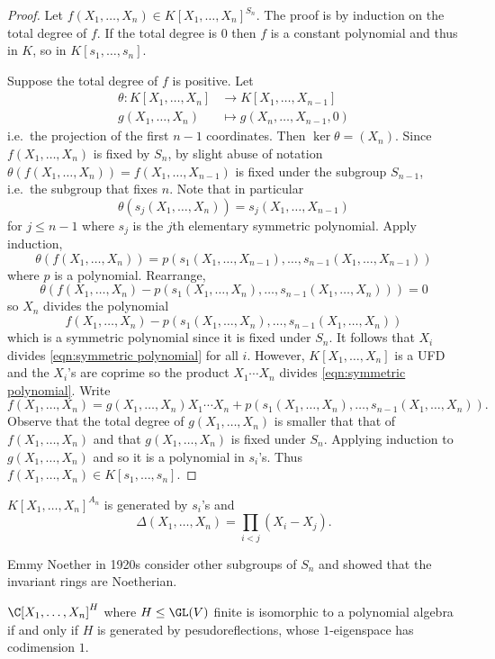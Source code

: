 \documentclass[a4paper]{article}
\begin{document}
\begin{proof}
  Let \(f(X_1, \dots, X_n) \in K[X_1, \dots, X_n]^{S_n}\). The proof is by induction on the total degree of \(f\). If the total degree is \(0\) then \(f\) is a constant polynomial and thus in \(K\), so in \(K[s_1, \dots, s_n]\).

  Suppose the total degree of \(f\) is positive. Let
  \begin{align*}
    \theta: K[X_1, \dots, X_n] &\to K[X_1, \dots, X_{n - 1}] \\
    g(X_1, \dots, X_n) &\mapsto g(X_n, \dots, X_{n - 1}, 0)
  \end{align*}
  i.e.\ the projection of the first \(n - 1\) coordinates. Then \(\ker \theta = (X_n)\). Since \(f(X_1, \dots, X_n)\) is fixed by \(S_n\), by slight abuse of notation \(\theta(f(X_1, \dots, X_n)) = f(X_1, \dots, X_{n - 1})\) is fixed under the subgroup \(S_{n - 1}\), i.e.\ the subgroup that fixes \(n\). Note that in particular
  \[
    \theta(s_j(X_1, \dots, X_n)) = s_j(X_1, \dots, X_{n - 1})
  \]
  for \(j \leq n - 1\) where \(s_j\) is the \(j\)th elementary symmetric polynomial. Apply induction,
  \[
    \theta(f(X_1, \dots, X_n)) = p(s_1(X_1, \dots, X_{n - 1}), \dots, s_{n - 1}(X_1, \dots, X_{n - 1}))
  \]
  where \(p\) is a polynomial. Rearrange,
  \[
    \theta(f(X_1, \dots, X_n) - p(s_1(X_1, \dots, X_n), \dots, s_{n - 1}(X_1, \dots, X_n))) = 0
  \]
  so \(X_n\) divides the polynomial
  \begin{equation*}
    \label{eqn:symmetric polynomial}
    f(X_1, \dots, X_n) - p(s_1(X_1, \dots, X_n), \dots, s_{n - 1}(X_1, \dots, X_n))
    \tag{\(\ast\)}
  \end{equation*}
  which is a symmetric polynomial since it is fixed under \(S_n\). It follows that \(X_i\) divides \eqref{eqn:symmetric polynomial} for all \(i\). However, \(K[X_1, \dots, X_n]\) is a UFD and the \(X_i\)'s are coprime so the product \(X_1\cdots X_n\) divides \eqref{eqn:symmetric polynomial}. Write
  \[
    f(X_1, \dots, X_n) = g(X_1, \dots, X_n) X_1\cdots X_n + p(s_1(X_1, \dots, X_n), \dots, s_{n - 1}(X_1, \dots, X_n)).
  \]
  Observe that the total degree of \(g(X_1, \dots, X_n)\) is smaller that that of \(f(X_1, \dots, X_n)\) and that \(g(X_1, \dots, X_n)\) is fixed under \(S_n\). Applying induction to \(g(X_1, \dots, X_n)\) and so it is a polynomial in \(s_i\)'s. Thus \(f(X_1, \dots, X_n) \in K[s_1, \dots, s_n]\).
\end{proof}

\begin{eg}
  \(K[X_1, \dots, X_n]^{A_n}\) is generated by \(s_i\)'s and
  \[
    \Delta(X_1, \dots, X_n) = \prod_{i < j}(X_i - X_j).
  \]
\end{eg}

Emmy Noether in 1920s consider other subgroups of \(S_n\) and showed that the invariant rings are Noetherian.

\begin{theorem}
  \(\C[X_1, \dots, X_n]^H\) where \(H \leq \GL(V)\) finite is isomorphic to a polynomial algebra if and only if \(H\) is generated by pesudoreflections, whose \(1\)-eigenspace has codimension \(1\).
\end{theorem}

\printindex
\end{document}
